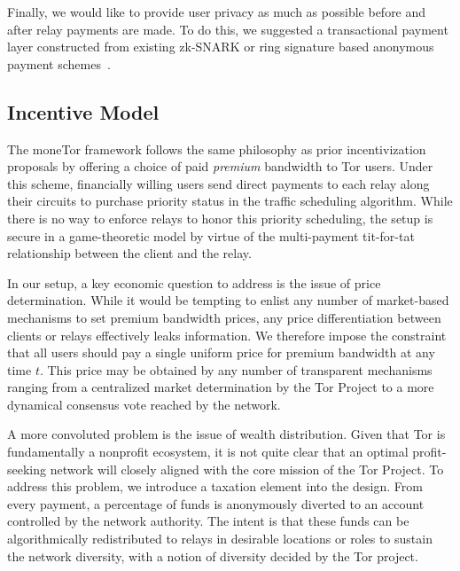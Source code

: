 Finally, we would like to provide user privacy as much as possible before and
after relay payments are made. To do this, we suggested a transactional payment
layer constructed from existing zk-SNARK or ring signature based anonymous
payment schemes~\cite{sasson2014zerocash, van2013cryptonote}.

\subsection{Incentive Model}
The moneTor framework follows the same philosophy as prior incentivization
proposals by offering a choice of paid \emph{premium} bandwidth to Tor
users. Under this scheme, financially willing users send direct payments to each
relay along their circuits to purchase priority status in the traffic scheduling
algorithm. While there is no way to enforce relays to honor this priority
scheduling, the setup is secure in a game-theoretic model by virtue of the
multi-payment tit-for-tat relationship between the client and the relay.

In our setup, a key economic question to address is the issue of price
determination. While it would be tempting to enlist any number of market-based
mechanisms to set premium bandwidth prices, any price differentiation between
clients or relays effectively leaks information. We therefore impose the
constraint that all users should pay a single uniform price for
premium bandwidth at any time $t$. This price may be obtained by any number of
transparent mechanisms ranging from a centralized market determination by the
Tor Project to a more dynamical consensus vote reached by the network.

A more convoluted problem is the issue of wealth distribution. Given that Tor is
fundamentally a nonprofit ecosystem, it is not quite clear that an optimal
profit-seeking network will closely aligned with the core mission of the Tor
Project. To address this problem, we introduce a taxation element into the
design. From every payment, a percentage of funds is anonymously diverted to an
account controlled by the network authority. The intent is that these funds can
be algorithmically redistributed to relays in desirable locations or roles to sustain the network diversity, with a notion of diversity decided by the Tor project.
